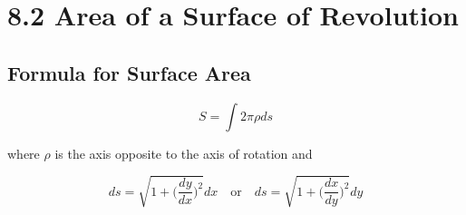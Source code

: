 %
%

\section*{8.2 Area of a Surface of Revolution}

\subsection*{Formula for Surface Area}

\[ S = \int{2 \pi \rho ds} \]
\begin{center}
where \(\rho\) is the axis opposite to the axis of rotation
and 
\end{center}
\[ ds = \sqrt{1 + \bigg( \frac{dy}{dx} \bigg)^2}dx \quad \text{or} \quad ds = \sqrt{1 + \bigg( \frac{dx}{dy} \bigg)^2}dy\]
